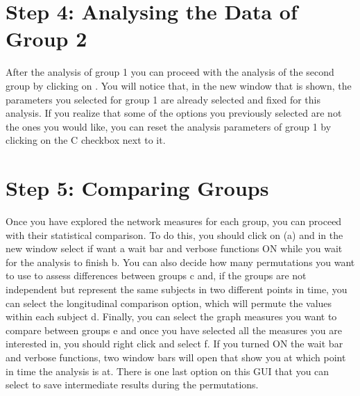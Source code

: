\documentclass[justified]{tufte-handout}
\begin{document}
{{{{\section{Step 4: Analysing the Data of Group 2}

After the analysis of group 1 you can proceed with the analysis of the second group by clicking on . You will notice that, in the new window that is shown, the parameters you selected for group 1 are already selected and fixed for this analysis. If you realize that some of the options you previously selected are not the ones you would like, you can reset the analysis parameters of group 1 by clicking on the C checkbox next to it.

\section{Step 5: Comparing Groups}

Once you have explored the network measures for each group, you can proceed with their statistical comparison. To do this, you should click on  (a) and in the new window select if want a wait bar and verbose functions ON while you wait for the analysis to finish {b}. You can also decide how many permutations you want to use to assess differences between groups {c} and, if the groups are not independent but represent the same subjects in two different points in time, you can select the longitudinal comparison option, which will permute the values within each subject {d}. Finally, you can select the graph measures you want to compare between groups {e} and once you have selected all the measures you are interested in, you should right click and select  {f}. If you turned ON the wait bar and verbose functions, two window bars will open that show you at which point in time the analysis is at. There is one last option on this GUI that you can select to save intermediate results during the permutations.

}}}}
\end{document}
